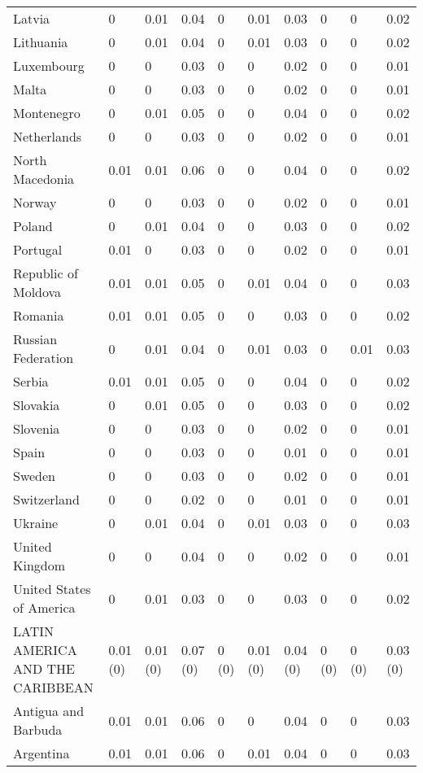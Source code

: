 \begin{longtable}[t]{llllllllll}
Latvia & 0 & 0.01 & 0.04 & 0 & 0.01 & 0.03 & 0 & 0 & 0.02\\
Lithuania & 0 & 0.01 & 0.04 & 0 & 0.01 & 0.03 & 0 & 0 & 0.02\\
Luxembourg & 0 & 0 & 0.03 & 0 & 0 & 0.02 & 0 & 0 & 0.01\\
Malta & 0 & 0 & 0.03 & 0 & 0 & 0.02 & 0 & 0 & 0.01\\
Montenegro & 0 & 0.01 & 0.05 & 0 & 0 & 0.04 & 0 & 0 & 0.02\\
Netherlands & 0 & 0 & 0.03 & 0 & 0 & 0.02 & 0 & 0 & 0.01\\
North Macedonia & 0.01 & 0.01 & 0.06 & 0 & 0 & 0.04 & 0 & 0 & 0.02\\
Norway & 0 & 0 & 0.03 & 0 & 0 & 0.02 & 0 & 0 & 0.01\\
Poland & 0 & 0.01 & 0.04 & 0 & 0 & 0.03 & 0 & 0 & 0.02\\
Portugal & 0.01 & 0 & 0.03 & 0 & 0 & 0.02 & 0 & 0 & 0.01\\
Republic of Moldova & 0.01 & 0.01 & 0.05 & 0 & 0.01 & 0.04 & 0 & 0 & 0.03\\
Romania & 0.01 & 0.01 & 0.05 & 0 & 0 & 0.03 & 0 & 0 & 0.02\\
Russian Federation & 0 & 0.01 & 0.04 & 0 & 0.01 & 0.03 & 0 & 0.01 & 0.03\\
Serbia & 0.01 & 0.01 & 0.05 & 0 & 0 & 0.04 & 0 & 0 & 0.02\\
Slovakia & 0 & 0.01 & 0.05 & 0 & 0 & 0.03 & 0 & 0 & 0.02\\
Slovenia & 0 & 0 & 0.03 & 0 & 0 & 0.02 & 0 & 0 & 0.01\\
Spain & 0 & 0 & 0.03 & 0 & 0 & 0.01 & 0 & 0 & 0.01\\
Sweden & 0 & 0 & 0.03 & 0 & 0 & 0.02 & 0 & 0 & 0.01\\
Switzerland & 0 & 0 & 0.02 & 0 & 0 & 0.01 & 0 & 0 & 0.01\\
Ukraine & 0 & 0.01 & 0.04 & 0 & 0.01 & 0.03 & 0 & 0 & 0.03\\
United Kingdom & 0 & 0 & 0.04 & 0 & 0 & 0.02 & 0 & 0 & 0.01\\
United States of America & 0 & 0.01 & 0.03 & 0 & 0 & 0.03 & 0 & 0 & 0.02\\
LATIN AMERICA AND THE CARIBBEAN & 0.01 (0) & 0.01 (0) & 0.07 (0) & 0 (0) & 0.01 (0) & 0.04 (0) & 0 (0) & 0 (0) & 0.03 (0)\\
Antigua and Barbuda & 0.01 & 0.01 & 0.06 & 0 & 0 & 0.04 & 0 & 0 & 0.03\\
Argentina & 0.01 & 0.01 & 0.06 & 0 & 0.01 & 0.04 & 0 & 0 & 0.03\\

\end{longtable}
